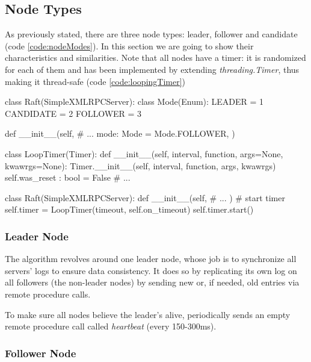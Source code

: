 \subsection{Node Types} \label{sec:nodes}

As previously stated, there are three node types: leader, follower and candidate (code \ref{code:nodeModes}). In this section we are going to show their characteristics and similarities. Note that all nodes have a timer: it is randomized for each of them and has been implemented by extending \textit{threading.Timer}, thus making it thread-safe (code \ref{code:loopingTimer})

\begin{python}[label={code:nodeModes}, caption={Node modes}]
class Raft(SimpleXMLRPCServer):
    class Mode(Enum):
        LEADER = 1
        CANDIDATE = 2
        FOLLOWER = 3
                
    def __init__(self, 
                 # ...
                 mode: Mode = Mode.FOLLOWER,
                 )
\end{python}

\begin{python}[label={code:loopingTimer}, caption={Threadsafe looping timer}]
class LoopTimer(Timer):
    def __init__(self, interval, function, args=None, kwawrgs=None):
        Timer.__init__(self, interval, function, args, kwawrgs)
        self.was_reset : bool = False
    # ...

class Raft(SimpleXMLRPCServer):
    def __init__(self, 
                 # ...
                 )
        # start timer
        self.timer = LoopTimer(timeout, self.on_timeout)
        self.timer.start()
\end{python}

\subsubsection{Leader Node}

The algorithm revolves around one leader node, whose job is to synchronize all servers' logs to ensure data consistency. It does so by replicating its own log on all followers (the non-leader nodes) by sending new or, if needed, old entries via remote procedure calls. 

To make sure all nodes believe the leader's alive, periodically sends an empty remote procedure call called \textit{heartbeat} (every 150-300ms).

\subsubsection{Follower Node}

